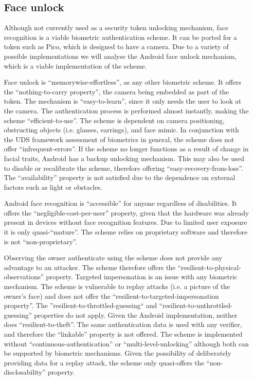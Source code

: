 	\subsection{Face unlock}
	Although not currently used as a security token unlocking mechanism, face recognition is a viable biometric authentication scheme. It can be ported for a token such as Pico, which is designed to have a camera. Due to a variety of possible implementations we will analyse the Android face unlock mechanism, which is a viable implementation of the scheme.
	
	Face unlock is ``memorywise-effortless'', as any other biometric scheme. It offers the ``nothing-to-carry property'', the camera being embedded as part of the token. The mechanism is ``easy-to-learn'', since it only needs the user to look at the camera. The authentication process is performed almost instantly, making the scheme ``efficient-to-use''. The scheme is dependent on camera positioning, obstructing objects (i.e. glasses, earrings), and face mimic. In conjunction with the UDS framework assessment of biometrics in general, the scheme does not offer ``infrequent-errors''. If the scheme no longer functions as a result of change in facial traits, Android has a backup unlocking mechanism. This may also be used to disable or recalibrate the scheme, therefore offering ``easy-recovery-from-loss''. The ``availability'' property is not satisfied due to the dependence on external factors such as light or obstacles.
	
	Android face recognition is ``accessible'' for anyone regardless of disabilities. It offers the ``negligible-cost-per-user'' property, given that the hardware was already present in devices without face recognition features. Due to limited user exposure it is only quasi-``mature''. The scheme relies on proprietary software and therefore is not ``non-proprietary''.
	
	Observing the owner authenticate using the scheme does not provide any advantage to an attacker. The scheme therefore offers the ``resilient-to-physical-observations'' property. Targeted impersonation is an issue with any biometric mechanism. The scheme is vulnerable to replay attacks (i.e. a picture of the owner's face) and does not offer the ``resilient-to-targeted-impersonation property''. The ''resilient-to-throttled-guessing`` and ``resilient-to-unthrottled-guessing'' properties do not apply. Given the Android implementation, neither does ``resilient-to-theft''. The same authentication data is used with any verifier, and therefore the ``linkable'' property is not offered. The scheme is implemented without ``continuous-authentication'' or ``multi-level-unlocking'' although both can be supported by biometric mechanisms. Given the possibility of deliberately providing data for a replay attack, the scheme only quasi-offers the ``non-disclosability'' property.

